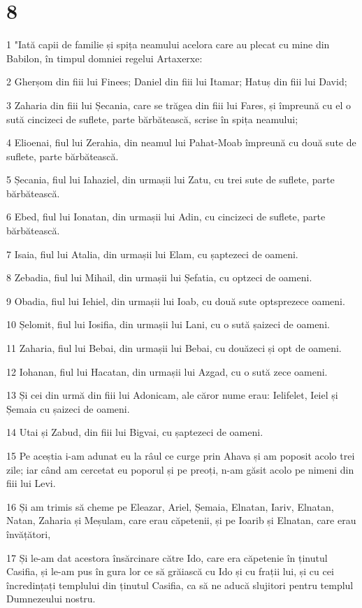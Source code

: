 \chapter{8}

\par 1 "Iată capii de familie și spița neamului acelora care au plecat cu mine din Babilon, în timpul domniei regelui Artaxerxe:
\par 2 Gherșom din fiii lui Finees; Daniel din fiii lui Itamar; Hatuș din fiii lui David;
\par 3 Zaharia din fiii lui Șecania, care se trăgea din fiii lui Fares, și împreună cu el o sută cincizeci de suflete, parte bărbătească, scrise în spița neamului;
\par 4 Elioenai, fiul lui Zerahia, din neamul lui Pahat-Moab împreună cu două sute de suflete, parte bărbătească.
\par 5 Șecania, fiul lui Iahaziel, din urmașii lui Zatu, cu trei sute de suflete, parte bărbătească.
\par 6 Ebed, fiul lui Ionatan, din urmașii lui Adin, cu cincizeci de suflete, parte bărbătească.
\par 7 Isaia, fiul lui Atalia, din urmașii lui Elam, cu șaptezeci de oameni.
\par 8 Zebadia, fiul lui Mihail, din urmașii lui Șefatia, cu optzeci de oameni.
\par 9 Obadia, fiul lui Iehiel, din urmașii lui Ioab, cu două sute optsprezece oameni.
\par 10 Șelomit, fiul lui Iosifia, din urmașii lui Lani, cu o sută șaizeci de oameni.
\par 11 Zaharia, fiul lui Bebai, din urmașii lui Bebai, cu douăzeci și opt de oameni.
\par 12 Iohanan, fiul lui Hacatan, din urmașii lui Azgad, cu o sută zece oameni.
\par 13 Și cei din urmă din fiii lui Adonicam, ale căror nume erau: Ielifelet, Ieiel și Șemaia cu șaizeci de oameni.
\par 14 Utai și Zabud, din fiii lui Bigvai, cu șaptezeci de oameni.
\par 15 Pe aceștia i-am adunat eu la râul ce curge prin Ahava și am poposit acolo trei zile; iar când am cercetat eu poporul și pe preoți, n-am găsit acolo pe nimeni din fiii lui Levi.
\par 16 Și am trimis să cheme pe Eleazar, Ariel, Șemaia, Elnatan, Iariv, Elnatan, Natan, Zaharia și Meșulam, care erau căpetenii, și pe Ioarib și Elnatan, care erau învățători,
\par 17 Și le-am dat acestora însărcinare către Ido, care era căpetenie în ținutul Casifia, și le-am pus în gura lor ce să grăiască cu Ido și cu frații lui, și cu cei încredințați templului din ținutul Casifia, ca să ne aducă slujitori pentru templul Dumnezeului nostru.
